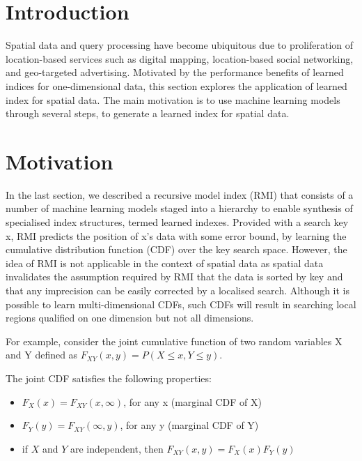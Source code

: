 

\section{Introduction}


Spatial data and query processing have become ubiquitous due to proliferation of location-based services such as digital mapping, location-based social networking,
and geo-targeted advertising. Motivated by the performance benefits of learned indices
for one-dimensional data, this section explores the application of learned index for spatial data. The main motivation is to use machine learning models through several steps, to generate a learned index for spatial data. 

\section{Motivation}
In the last section, we described a recursive model index (RMI) that consists of a
number of machine learning models staged into a hierarchy to enable synthesis of specialised index structures, termed learned indexes. Provided with a search key x, RMI predicts the position of x's data with some error bound, by learning the cumulative distribution function (CDF) over the key search space. However, the idea of RMI is not applicable in the context of spatial data as spatial data invalidates the assumption required by RMI that the data is sorted by key and that any imprecision can be easily corrected by a localised search. Although it is possible to learn multi-dimensional CDFs, such CDFs will result in searching local regions qualified on one dimension but not all dimensions.

For example, consider the joint cumulative function of two random variables X and Y defined as $F_{XY}(x, y)=P(X\leq x, Y\leq y)$.

The joint CDF satisfies the following properties:

\begin{itemize}
  \item  {$F_X(x)=F_{XY}(x,\infty)$, for any x (marginal CDF of X)}
  \item  {$F_Y(y)=F_{XY}(\infty,y)$, for any y (marginal CDF of Y)}
  \item  {if $X$ and $Y$ are independent, then $F_{XY}(x,y)=F_X(x)F_Y(y)$}
\end{itemize}

